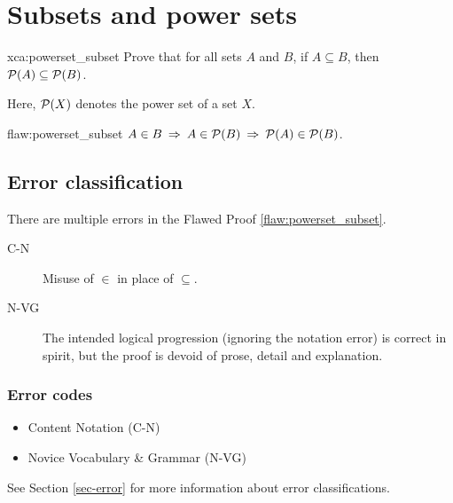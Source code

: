 \section{Subsets and power sets}

\begin{xca}{xca:powerset_subset}
Prove that for all sets $A$ and $B$, if $A \subseteq B$, then $\mathcal P(A) \subseteq \mathcal P(B)$. 

\noindent Here,  $\mathcal P(X)$ denotes the power set of a set $X$.
\end{xca}

\begin{flaw}{flaw:powerset_subset} 
$A \in B \: \Rightarrow \: A \in \mathcal P(B) \: \Rightarrow \: \mathcal P(A) \in \mathcal P(B)$.  
\end{flaw}

\clearpage
\subsection{Error classification}

There are multiple errors
 in the Flawed Proof \ref{flaw:powerset_subset}. 
 
 \begin{description}
    \item[C-N] Misuse of $\in$ in place of  $\subseteq$.
    \item[N-VG] The intended logical progression (ignoring the notation error) is correct in spirit, but the proof is devoid of prose, detail and explanation. 
 \end{description}

 
\subsubsection{Error codes}
\begin{itemize}
    \item Content Notation (C-N)
	\item Novice Vocabulary \& Grammar (N-VG)
\end{itemize}
See Section \ref{sec-error} for more information about error classifications.

